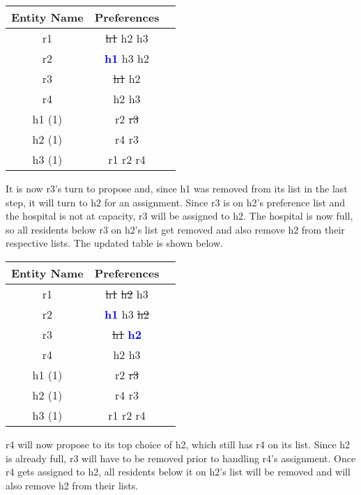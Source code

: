 \documentclass[letterpaper, 10pt,DIV=13]{scrartcl}
\numberwithin{equation}{section} %
\numberwithin{figure}{section} %
\numberwithin{table}{section} %
\begin{document}
\begin{center}
  \begin{tabular}{|c|c|c|}
    \hline
    Entity Name & Preferences \\
    \hline
    r1 & \st{h1} h2 h3 \\
    \hline
    r2 & \textcolor{blue}{\textbf{h1}} h3 h2 \\
    \hline
    r3 & \st{h1} h2 \\
    \hline
    r4 & h2 h3 \\
    \hline
    \hline
    h1 (1) & r2 \st{r3} \\
    \hline
    h2 (1) & r4 r3 \\
    \hline
    h3 (1) & r1 r2 r4 \\
    \hline
  \end{tabular}
\end{center}

It is now r3's turn to propose and, since h1 was removed from its list in the last step, it will turn to h2 for an assignment. Since r3 is on h2's preference list and the hospital is not at capacity, r3 will be assigned to h2. The hospital is now full, so all residents below r3 on h2's list get removed and also remove h2 from their respective lists. The updated table is shown below.

\begin{center}
  \begin{tabular}{|c|c|c|}
    \hline
    Entity Name & Preferences \\
    \hline
    r1 & \st{h1} \st{h2} h3 \\
    \hline
    r2 & \textcolor{blue}{\textbf{h1}} h3 \st{h2} \\
    \hline
    r3 & \st{h1} \textcolor{blue}{\textbf{h2}} \\
    \hline
    r4 & h2 h3 \\
    \hline
    \hline
    h1 (1) & r2 \st{r3} \\
    \hline
    h2 (1) & r4 r3 \\
    \hline
    h3 (1) & r1 r2 r4 \\
    \hline
  \end{tabular}
\end{center}

r4 will now propose to its top choice of h2, which still has r4 on its list. Since h2 is already full, r3 will have to be removed prior to handling r4's assignment. Once r4 gets assigned to h2, all residents below it on h2's list will be removed and will also remove h2 from their lists.
\end{document}
